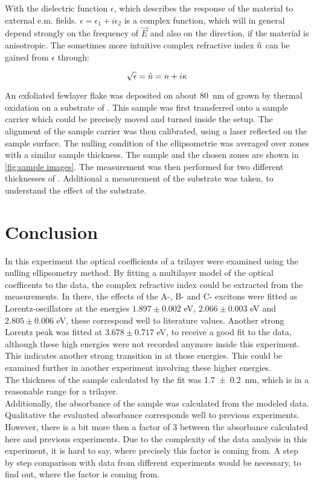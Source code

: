\documentclass[english]{article}
\begin{document}
With the dielectric function $\epsilon$, which describes the response of the material to external e.m. fields. $\epsilon=\epsilon_1 +i \epsilon_2$ is a complex function, which will in general depend strongly on the frequency of $\Vec{E}$ and also on the direction, if the material is anisotropic. The sometimes more intuitive complex refractive index $\Tilde{n}$ can be gained from $\epsilon$ through:

\begin{equation}
    \sqrt{\epsilon}= \Tilde{n}= n+ i\kappa
\end{equation}


An exfoliated  fewlayer flake was deposited on about \SI{80}{nm} of  grown by thermal oxidation on a substrate of . This sample was first transferred onto a sample carrier which could be precisely moved and turned inside the setup. The alignment of the sample carrier was then calibrated, using a laser reflected on the sample surface. The nulling condition of the ellipsometrie was averaged over zones with a similar sample thickness. The sample and the chosen zones are shown in  \cref{fig:sample images}. The measurement was then performed for two different thicknesses of . Additional a measurement of the  substrate was taken, to understand the effect of the substrate.


\section{Conclusion}

In this experiment the optical coefficients of a  trilayer were examined using the nulling ellipsometry method. By fitting a multilayer model of the optical coefficents to the data, the complex refractive index could be extracted from the measurements. In there, the effects of the A-, B- and C- excitons were fitted as Lorentz-oscillators at the energies $1.897 \pm 0.002$ eV, $2.066 \pm 0.003$ eV and $2.805 \pm 0.006$ eV, these correspond well to literature values. Another strong Lorentz peak was fitted at $3.678 \pm 0.717$ eV, to receive a good fit to the data, although these high energies were not recorded anymore inside this experiment. This indicates another strong transition in  at those energies. This could be examined further in another experiment involving these higher energies.\\
The thickness of the sample calculated by the fit was \SI{1.7 \pm 0.2}{nm}, which is in a reasonable range for a  trilayer.\\
Additionally, the absorbance of the sample was calculated from the modeled data. Qualitative the evaluated absorbance corresponds well to previous experiments. However, there is a bit more then a factor of 3 between the absorbance calculated here and previous experiments. Due to the complexity of the data analysis in this experiment, it is hard to say, where precisely this factor is coming from. A step by step comparison with data from different experiments would be necessary, to find out, where the factor is coming from.


\newpage





\appendix
\end{document}
